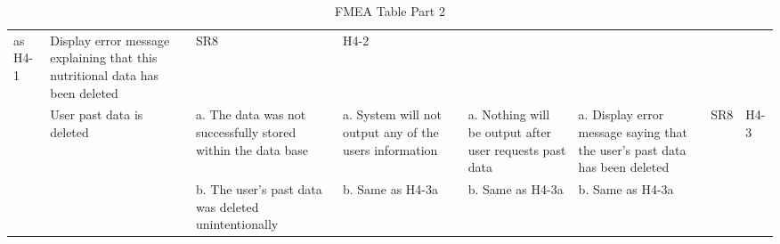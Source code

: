 \documentclass{article}
\begin{document}
\begin{landscape}
\begin{table}[ht]
{\begin{tabular}{|p{2cm}|p{3cm}|p{3cm}|p{3cm}|p{3cm}|p{3cm}|p{1cm}|p{1cm}|}
				as H4-1 & Display error message explaining that this 
				nutritional data has been deleted & SR8 & H4-2\\ \cline{2-8}
				& User past data is deleted & a. The data was not successfully 
				stored within the data base & a. System will not output any of 
				the users information & a. Nothing will be output after user 
				requests past data & a. Display error message saying that the 
				user's past data has been deleted & SR8 & H4-3\\ 
				& & b. The user's past data was deleted unintentionally & b. Same as H4-3a & b. Same as H4-3a & b. Same as H4-3a & &\\\hline
			\end{tabular}
		}
		
		\caption{FMEA Table Part 2}
		\label{FMEAPart2}
	\end{table}
\end{landscape}
\end{document}
